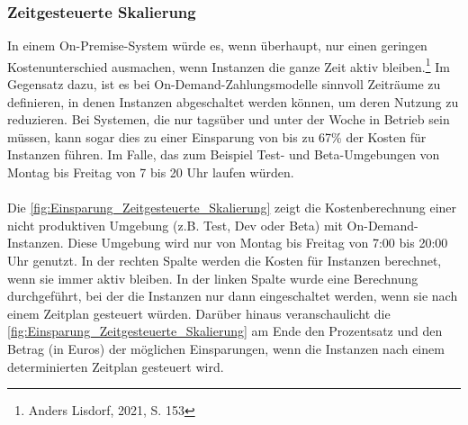 \subsubsection{Zeitgesteuerte Skalierung}\label{ssec:ZeitgesteuerteScal}
In einem On-Premise-System würde es, wenn überhaupt, nur einen geringen Kostenunterschied ausmachen, wenn Instanzen die ganze Zeit aktiv bleiben.\footnote{Anders Lisdorf, 2021, S. 153\cite{CCB}} %
Im Gegensatz dazu, ist es bei On-Demand-Zahlungsmodelle sinnvoll Zeiträume zu definieren, in denen Instanzen abgeschaltet werden können, um deren Nutzung zu reduzieren. Bei Systemen, die nur tagsüber und unter der Woche in Betrieb sein müssen, kann sogar dies zu einer Einsparung von bis zu 67\% der Kosten für Instanzen führen. Im Falle, das zum Beispiel Test- und Beta-Umgebungen von Montag bis Freitag von 7 bis 20 Uhr laufen würden. 
\\\\
Die \autoref{fig:Einsparung_Zeitgesteuerte_Skalierung} zeigt die Kostenberechnung einer nicht produktiven Umgebung (z.B. Test, Dev oder Beta) mit On-Demand-Instanzen. Diese Umgebung wird nur von Montag bis Freitag von 7:00 bis 20:00 Uhr genutzt. In der rechten Spalte werden die Kosten für Instanzen berechnet, wenn sie immer aktiv bleiben. In der linken Spalte wurde eine Berechnung durchgeführt, bei der die Instanzen nur dann eingeschaltet werden, wenn sie nach einem Zeitplan gesteuert würden. Darüber hinaus veranschaulicht die \autoref{fig:Einsparung_Zeitgesteuerte_Skalierung} am Ende den Prozentsatz und den Betrag (in Euros) der möglichen Einsparungen, wenn die Instanzen nach einem determinierten Zeitplan gesteuert wird.

